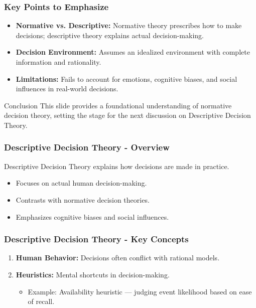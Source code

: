 \documentclass[aspectratio=169]{beamer}
\begin{document}
\begin{frame}[fragile]
    \frametitle{Key Points to Emphasize}
    \begin{itemize}
        \item \textbf{Normative vs. Descriptive:} Normative theory prescribes how to make decisions; descriptive theory explains actual decision-making.
        \item \textbf{Decision Environment:} Assumes an idealized environment with complete information and rationality.
        \item \textbf{Limitations:} Fails to account for emotions, cognitive biases, and social influences in real-world decisions.
    \end{itemize}
    \begin{block}{Conclusion}
        This slide provides a foundational understanding of normative decision theory, setting the stage for the next discussion on Descriptive Decision Theory.
    \end{block}
\end{frame}

\begin{frame}[fragile]
    \frametitle{Descriptive Decision Theory - Overview}
    Descriptive Decision Theory explains how decisions are made in practice.
    \begin{itemize}
        \item Focuses on actual human decision-making.
        \item Contrasts with normative decision theories.
        \item Emphasizes cognitive biases and social influences.
    \end{itemize}
\end{frame}

\begin{frame}[fragile]
    \frametitle{Descriptive Decision Theory - Key Concepts}
    \begin{enumerate}
        \item \textbf{Human Behavior:} Decisions often conflict with rational models.
        \item \textbf{Heuristics:} Mental shortcuts in decision-making.
        \begin{itemize}
            \item Example: Availability heuristic — judging event likelihood based on ease of recall.
        \end{itemize}
    \end{enumerate}
\end{frame}
\end{document}
